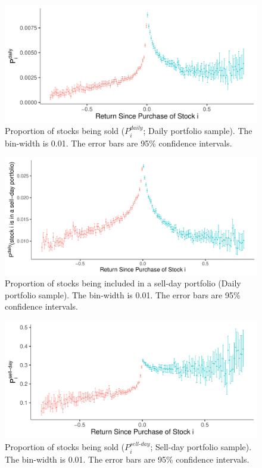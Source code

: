\documentclass[11pt, a4paper]{article}
\begin{document}
\begin{appendices}
\begin{figure}[H]
	\centering
	\includegraphics[width=0.8\columnwidth]{barc_schedule_daily_all_3.pdf}
	\caption{Proportion of stocks being sold ($P^{daily}_{i}$; Daily portfolio sample). The bin-width is 0.01. The error bars are 95\% confidence intervals.}
	\label{figure:prop_all}
\end{figure}


\begin{figure}[H]
	\centering
	\includegraphics[width=0.8\columnwidth]{barc_port_sell_3.pdf}
	\caption{\small Proportion of stocks being included in a sell-day portfolio (Daily portfolio sample). The bin-width is 0.01. The error bars are 95\% confidence intervals.}
	\label{figure:prop_sell_day}
\end{figure}



\begin{figure}[H]
	\centering
	\includegraphics[width=0.8\columnwidth]{barc_schedule_sell_day_3.pdf}
	\caption{\small Proportion of stocks being sold ($P^{sell\mbox{-}day}_{i}$; Sell-day portfolio sample). The bin-width is 0.01. The error bars are 95\% confidence intervals.}
	\label{figure:prop_sell_days}
\end{figure}


\end{appendices}
\end{document}

